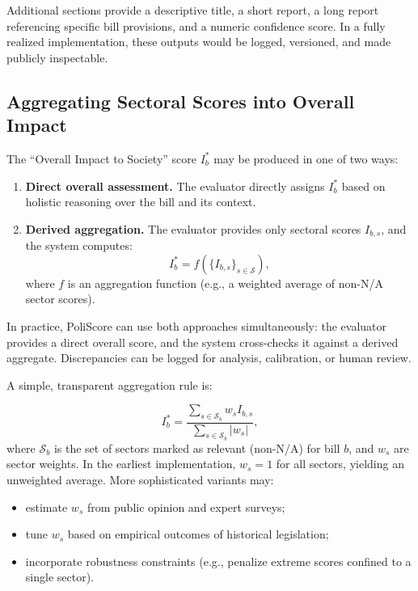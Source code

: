 \documentclass[12pt]{article}
\begin{document}
Additional sections provide a descriptive title, a short report, a long report referencing specific bill provisions, and a
numeric confidence score. In a fully realized implementation, these outputs would be logged, versioned, and made publicly
inspectable.

\subsection{Aggregating Sectoral Scores into Overall Impact}

The ``Overall Impact to Society'' score \(I_b^{\ast}\) may be produced in one of two ways:

\begin{enumerate}
    \item \textbf{Direct overall assessment.} The evaluator directly assigns \(I_b^{\ast}\) based on holistic reasoning over the bill and its context.
    \item \textbf{Derived aggregation.} The evaluator provides only sectoral scores \(I_{b,s}\), and the system computes:
    \[
    I_b^{\ast} = f(\{I_{b,s}\}_{s \in \mathcal{S}}),
    \]
    where \(f\) is an aggregation function (e.g., a weighted average of non-N/A sector scores).
\end{enumerate}

In practice, PoliScore can use both approaches simultaneously: the evaluator provides a direct overall score, and the
system cross-checks it against a derived aggregate. Discrepancies can be logged for analysis, calibration, or human review.

A simple, transparent aggregation rule is:

\[
I_b^{\ast} = \frac{\sum_{s \in \mathcal{S}_{b}} w_s I_{b,s}}{\sum_{s \in \mathcal{S}_{b}} |w_s|},
\]
where \(\mathcal{S}_{b}\) is the set of sectors marked as relevant (non-N/A) for bill \(b\), and \(w_s\) are sector weights.
In the earliest implementation, \(w_s = 1\) for all sectors, yielding an unweighted average. More sophisticated variants
may:

\begin{itemize}
    \item estimate \(w_s\) from public opinion and expert surveys;
    \item tune \(w_s\) based on empirical outcomes of historical legislation;
    \item incorporate robustness constraints (e.g., penalize extreme scores confined to a single sector).
\end{itemize}
\end{document}
